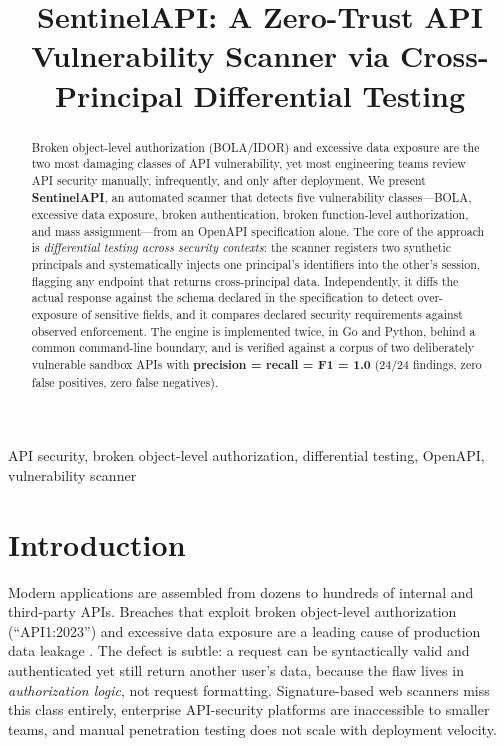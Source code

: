 \documentclass[conference]{IEEEtran}
\begin{document}
\title{SentinelAPI: A Zero-Trust API Vulnerability Scanner via Cross-Principal Differential Testing}

\author{
}

\maketitle

\begin{abstract}
Broken object-level authorization (BOLA/IDOR) and excessive data exposure are
the two most damaging classes of API vulnerability, yet most engineering teams
review API security manually, infrequently, and only after deployment. We
present \textbf{SentinelAPI}, an automated scanner that detects five
vulnerability classes---BOLA, excessive data exposure, broken authentication,
broken function-level authorization, and mass assignment---from an OpenAPI
specification alone. The core of the approach is \emph{differential testing
across security contexts}: the scanner registers two synthetic principals and
systematically injects one principal's identifiers into the other's session,
flagging any endpoint that returns cross-principal data. Independently, it
diffs the actual response against the schema declared in the specification to
detect over-exposure of sensitive fields, and it compares declared security
requirements against observed enforcement. The engine is implemented twice, in
Go and Python, behind a common command-line boundary, and is verified against a
corpus of two deliberately vulnerable sandbox APIs with \textbf{precision =
recall = F1 = 1.0} (24/24 findings, zero false positives, zero false negatives).
\end{abstract}

\begin{IEEEkeywords}
API security, broken object-level authorization, differential testing, OpenAPI,
vulnerability scanner
\end{IEEEkeywords}

\section{Introduction}
Modern applications are assembled from dozens to hundreds of internal and
third-party APIs. Breaches that exploit broken object-level authorization
(``API1:2023'') and excessive data exposure are a leading cause of production
data leakage \cite{owasp}. The defect is subtle: a request can be syntactically
valid and authenticated yet still return another user's data, because the flaw
lives in \emph{authorization logic}, not request formatting. Signature-based web
scanners miss this class entirely, enterprise API-security platforms are
inaccessible to smaller teams, and manual penetration testing does not scale
with deployment velocity.
\end{document}
